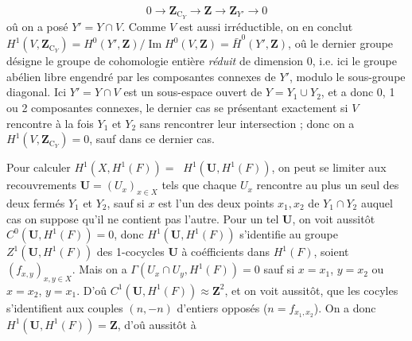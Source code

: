 \[
0\to\mathbf Z_{\mathrm C_Y}\to\mathbf Z
\to\mathbf Z_{Y'}\to 0
\]
oû on a posé $Y'=Y\cap V$. Comme $V$ est aussi irréductible, on en conclut
$H^1(V,\mathbf Z_{\mathrm C_Y})
=H^0(Y',\mathbf Z)/\operatorname{Im}H^0(V,\mathbf Z)
=\bar H^0(Y',\mathbf Z)$,
oû le dernier groupe désigne le groupe de cohomologie entière \emph{réduit} de
dimension 0, i.e. ici le groupe abélien libre engendré par les composantes
connexes de $Y'$, modulo le sous-groupe diagonal.
Ici $Y'=Y\cap V$ est un sous-espace ouvert de $Y=Y_1\cup Y_2$, et a donc 0, 1
ou 2 composantes connexes, le dernier cas se présentant exactement si $V$
rencontre à la fois $Y_1$ et $Y_2$ sans rencontrer leur intersection ; donc on
a $H^1(V,\mathbf Z_{\mathrm C_Y})=0$, sauf dans ce dernier cas.

Pour calculer
$H^1(X,H^1(F))=\mathop{\underset{\to}{\lim}} H^1(\mathbf U,H^1(F))$,
on peut se limiter aux recouvrements $\mathbf U=(U_x)_{x\in X}$ tels que
chaque $U_x$ rencontre au plus un seul des deux fermés $Y_1$ et $Y_2$, sauf si
$x$ est l'un des deux points $x_1,x_2$ de $Y_1\cap Y_2$ auquel cas on suppose
qu'il ne contient pas l'autre.
Pour un tel $\mathbf U$, on voit aussitôt
$C^0(\mathbf U,H^1(F))=0$, donc $H^1(\mathbf U,H^1(F))$ s'identifie au groupe
$Z^1(\mathbf U,H^1(F))$ des 1-cocycles $\mathbf U$ à coéfficients dans
$H^1(F)$, soient $(f_{x,y})_{x,y\in X}$.
Mais on a
$\Gamma(U_x\cap U_y,H^1(F))=0$
sauf si $x=x_1$, $y=x_2$ ou $x=x_2$, $y=x_1$. D'oû
$C^1(\mathbf U,H^1(F))\approx\mathbf Z^2$,
et on voit aussitôt, que les cocyles s'identifient aux couples $(n,-n)$
d'entiers opposés ($n=f_{x_1,x_2}$).
On a donc $H^1(\mathbf U,H^1(F))=\mathbf Z$, d'oû aussitôt à

